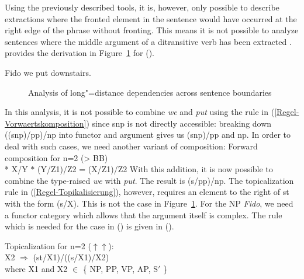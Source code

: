 %
Using the previously described tools, it is, however, only possible to describe extractions where the fronted element
in the sentence would have occurred at the right edge of the phrase without fronting. This means it
is not possible to analyze sentences where the middle argument of a ditransitive verb has been
extracted \citep[]{Steedman85a-u}. \citet[]{Pollard88a} provides the derivation in
Figure~\ref{abb-CG-UDC-Ditrans} for ().

\ea
Fido we put downstairs.
\z
\begin{figure}
\centerline{%
}
\caption{\label{abb-CG-UDC-Ditrans}Analysis of long"=distance dependencies across sentence boundaries}
\end{figure}%
In this analysis, it is not possible to combine \emph{we} and \emph{put} using the rule in
(\ref{Regel-Vorwaertskomposition}) since s\bs np is not directly accessible: 
breaking down ((s\bs np)/pp)/np into functor and argument gives us (s\bs np)/pp and np. 
In order to deal with such cases, we need another variant of composition:
\pagebreak
\ea
Forward composition for n=2 (> BB)\\*
X/Y $*$ (Y/Z1)/Z2 = (X/Z1)/Z2
\z
With this addition, it is now possible to combine the type-raised \emph{we} with \emph{put}. The result is (s/pp)/np.
The topicalization rule in (\ref{Regel-Topikalisierung}), however, requires an element to the right of st with the form
(s/X). This is not the case in Figure~\ref{abb-CG-UDC-Ditrans}. For the NP \emph{Fido}, we need a functor category
which allows that the argument itself is complex. The rule which is needed for the case in
() is given in ().

\ea
\label{Regel-Topikalisierung-zwei}
Topicalization for n=2 ($\uparrow\uparrow$\is{$\uparrow\uparrow$}):\\
X2 $\Rightarrow$ (st/X1)/((s/X1)/X2)\\
where X1 and X2 $\in$ \{ NP, PP, VP, AP, S$'$ \}
\z

